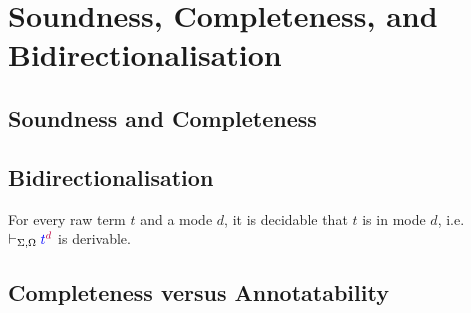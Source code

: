 
\section{Soundness, Completeness, and Bidirectionalisation} \label{sec:annotatability}

\subsection{Soundness and Completeness}
\begin{theorem}[Soundness]\label{thm:term-soundness}
    
\end{theorem}



\begin{theorem}[Completeness]\label{thm:term-completeness}
    
\end{theorem}

\subsection{Bidirectionalisation}
\begin{proposition} \label{thm:bidirectionalisation}
  For every raw term $t$ and a mode $d$, it is decidable that $t$ is in mode $d$, i.e.\ $\vdash_{\Sigma, \Omega} {\textcolor{blue}{t}}^{\mathrel{\textcolor{purple}{d}}}$ is derivable.
\end{proposition}

\subsection{Completeness versus Annotatability}



